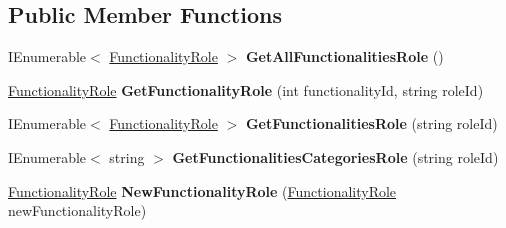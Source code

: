 \subsection*{Public Member Functions}
\begin{DoxyCompactItemize}
\item 
\mbox{\label{interface_h_k_supply_1_1_services_1_1_interfaces_1_1_i_functionality_role_a5db7b5d6e33c8f79666a34ab4460fcfd}} 
I\+Enumerable$<$ \mbox{\hyperlink{class_h_k_supply_1_1_models_1_1_functionality_role}{Functionality\+Role}} $>$ {\bfseries Get\+All\+Functionalities\+Role} ()
\item 
\mbox{\label{interface_h_k_supply_1_1_services_1_1_interfaces_1_1_i_functionality_role_a10baae97837f0bffcbb4cd5e6d9da56d}} 
\mbox{\hyperlink{class_h_k_supply_1_1_models_1_1_functionality_role}{Functionality\+Role}} {\bfseries Get\+Functionality\+Role} (int functionality\+Id, string role\+Id)
\item 
\mbox{\label{interface_h_k_supply_1_1_services_1_1_interfaces_1_1_i_functionality_role_a75bfe6931c107903bfa876ca21eb032a}} 
I\+Enumerable$<$ \mbox{\hyperlink{class_h_k_supply_1_1_models_1_1_functionality_role}{Functionality\+Role}} $>$ {\bfseries Get\+Functionalities\+Role} (string role\+Id)
\item 
\mbox{\label{interface_h_k_supply_1_1_services_1_1_interfaces_1_1_i_functionality_role_a9431314adb2c808619b1cde6366b68d7}} 
I\+Enumerable$<$ string $>$ {\bfseries Get\+Functionalities\+Categories\+Role} (string role\+Id)
\item 
\mbox{\label{interface_h_k_supply_1_1_services_1_1_interfaces_1_1_i_functionality_role_a8ccda5eb882dbe88c4d3f8257d6353b7}} 
\mbox{\hyperlink{class_h_k_supply_1_1_models_1_1_functionality_role}{Functionality\+Role}} {\bfseries New\+Functionality\+Role} (\mbox{\hyperlink{class_h_k_supply_1_1_models_1_1_functionality_role}{Functionality\+Role}} new\+Functionality\+Role)
\item 

\end{DoxyCompactItemize}
